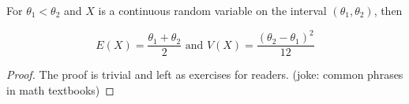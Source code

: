 \begin{theorem}
    For $\theta_1 < \theta_2$ and $X$ is a continuous random variable on the interval $(\theta_1, \theta_2)$,
    then

    \[
    E(X) = \frac{\theta_1 + \theta_2}{2} \text{ and } V(X) = \frac{{(\theta_2 - \theta_1)}^2}{12}
    \]
\end{theorem}
\begin{proof}
    The proof is trivial and left as exercises for readers. (joke: common phrases in math textbooks)
\end{proof}
